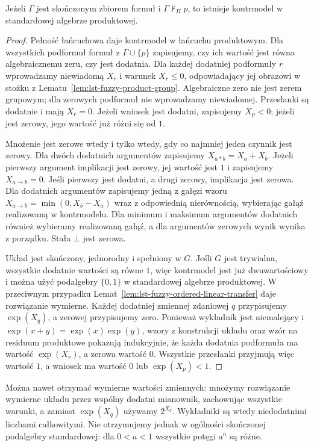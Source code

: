 \begin{twierdzenie}
\label{thm:lst-fuzzy-product-finite-countermodel}
Jeżeli $\Gamma$ jest skończonym zbiorem formuł i
$\Gamma\nvdash_{\Pi}p$, to istnieje kontrmodel
w standardowej algebrze produktowej.
\end{twierdzenie}
\begin{proof}
Pełność łańcuchowa daje kontrmodel w łańcuchu
produktowym. Dla wszystkich podformuł formuł
z $\Gamma\cup\{p\}$ zapisujemy, czy ich wartość
jest równa algebraicznemu zeru, czy jest dodatnia.
Dla każdej dodatniej podformuły $r$ wprowadzamy
niewiadomą $X_r$ i warunek $X_r\leq0$,
odpowiadający jej obrazowi w stożku
z Lematu~\ref{lem:lst-fuzzy-product-group}.
Algebraiczne zero nie jest zerem grupowym;
dla zerowych podformuł nie wprowadzamy niewiadomej.
Przesłanki są dodatnie i mają $X_r=0$.
Jeżeli wniosek jest dodatni, zapisujemy $X_p<0$;
jeżeli jest zerowy, jego wartość już różni się od $1$.

Mnożenie jest zerowe wtedy i tylko wtedy,
gdy co najmniej jeden czynnik jest zerowy.
Dla dwóch dodatnich argumentów zapisujemy
$X_{a*b}=X_a+X_b$.
Jeżeli pierwszy argument implikacji jest zerowy,
jej wartość jest $1$ i zapisujemy $X_{a\to b}=0$.
Jeśli pierwszy jest dodatni, a drugi zerowy,
implikacja jest zerowa. Dla dodatnich argumentów
zapisujemy jedną z gałęzi wzoru
$X_{a\to b}=\min(0,X_b-X_a)$ wraz z odpowiednią
nierównością, wybierając gałąź realizowaną
w kontrmodelu. Dla minimum i maksimum argumentów
dodatnich również wybieramy realizowaną gałąź,
a dla argumentów zerowych wynik wynika z porządku.
Stała $\bot$ jest zerowa.

Układ jest skończony, jednorodny i spełniony w $G$.
Jeśli $G$ jest trywialna, wszystkie dodatnie wartości
są równe $1$, więc kontrmodel jest już dwuwartościowy
i można użyć podalgebry $\{0,1\}$ w standardowej
algebrze produktowej. W przeciwnym przypadku
Lemat~\ref{lem:lst-fuzzy-ordered-linear-transfer}
daje rozwiązanie wymierne.
Każdej dodatniej zmiennej zdaniowej $q$ przypisujemy
$\exp(X_q)$, a zerowej przypisujemy zero.
Ponieważ wykładnik jest niemalejący i
$\exp(x+y)=\exp(x)\exp(y)$, wzory z konstrukcji
układu oraz wzór na residuum produktowe pokazują
indukcyjnie, że każda dodatnia podformuła ma
wartość $\exp(X_r)$, a zerowa wartość $0$.
Wszystkie przesłanki przyjmują więc wartość $1$,
a wniosek ma wartość $0$ lub $\exp(X_p)<1$.
\end{proof}
Można nawet otrzymać wymierne wartości zmiennych:
mnożymy rozwiązanie wymierne układu przez wspólny
dodatni mianownik, zachowując wszystkie warunki,
a zamiast $\exp(X_q)$ używamy $2^{X_q}$.
Wykładniki są wtedy niedodatnimi liczbami całkowitymi.
Nie otrzymujemy jednak w ogólności skończonej
podalgebry standardowej: dla $0<a<1$ wszystkie
potęgi $a^n$ są różne.

